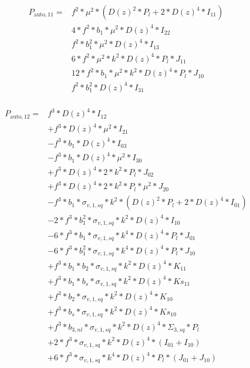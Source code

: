 \documentclass{article}
\begin{document}
\begin{equation}
\begin{aligned}  
P_{\mathrm{auto},11}=&f^{2}*\mu^{2}*(D(z)^{2}*P_l + 2*D(z)^{4}*I_{11}) \\
&4*f^{2}*b_{1}*\mu^{2}*D(z)^{4}*I_{22}  \\
&f^{2}*b_{1}^{2}*\mu^{2}*D(z)^{4}*I_{13}  \\
&6*f^{2}*\mu^{2}*k^{2}*D(z)^{4}*P_l*J_{11}  \\
&12*f^{2}*b_{1}*\mu^{2}*k^{2}*D(z)^{4}*P_l*J_{10}  \\
&f^{2}*b_{1}^{2}*D(z)^{4}*I_{31} \\
\end{aligned}
\end{equation}

\begin{equation}
\begin{aligned}  
P_{\mathrm{auto},12}=&f^{3}*D(z)^{4}*I_{12} \\
&+f^{3}*D(z)^{4}*\mu^{2}*I_{21} \\
&-f^{3}*b_{1}*D(z)^{4}*I_{03} \\
&-f^{3}*b_{1}*D(z)^{4}*\mu^{2}*I_{30} \\
&+f^{3}*D(z)^{4}*2*k^{2}*P_l*J_{02} \\
&+f^{3}*D(z)^{4}*2*k^{2}*P_l*\mu^{2}*J_{20} \\
&-f^{3}*b_{1}*\sigma_{v,1,sq}*k^{2}*(D(z)^{2}*P_l + 2*D(z)^{4}*I_{01}) \\
&-2*f^{3}*b_{1}^{2}*\sigma_{v,1,sq}*k^{2}*D(z)^{4}*I_{10} \\
&-6*f^{3}*b_{1}*\sigma_{v,1,sq}*k^{4}*D(z)^{4}*P_l*J_{01} \\
&-6*f^{3}*b_{1}^{2}*\sigma_{v,1,sq}*k^{4}*D(z)^{4}*P_l*J_{10} \\
&+f^{3}*b_{1}*b_{2}*\sigma_{v,1,sq}*k^{2}*D(z)^{4}*K_{11} \\
&+f^{3}*b_{1}*b_{s}*\sigma_{v,1,sq}*k^{2}*D(z)^{4}*Ks_{11} \\
&+f^{3}*b_{2}*\sigma_{v,1,sq}*k^{2}*D(z)^{4}*K_{10} \\
&+f^{3}*b_{s}*\sigma_{v,1,sq}*k^{2}*D(z)^{4}*Ks_{10} \\
&+f^{3}*b_{3,nl}*\sigma_{v,1,sq}*k^{2}*D(z)^{4}*\Sigma_{3,sq}*P_l \\
&+2*f^{3}*\sigma_{v,1,sq}*k^{2}*D(z)^{4}*(I_{01}+I_{10})\\
&+6*f^{3}*\sigma_{v,1,sq}*k^{4}*D(z)^{4}*P_l*(J_{01}+J_{10})\\
\end{aligned}
\end{equation}
\end{document}
